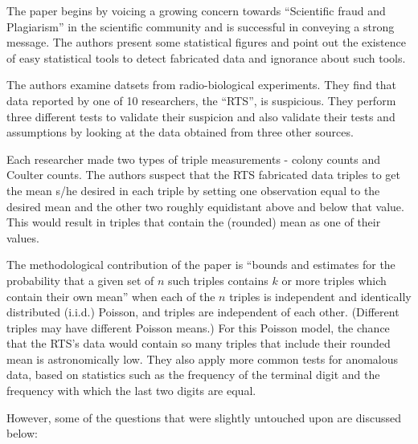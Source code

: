 \documentclass{article}
\begin{document}
The paper begins by voicing a growing concern towards ``Scientific fraud
and Plagiarism'' in the scientific community and is successful in
conveying a strong message.
The authors present some statistical figures and point out the existence of easy statistical tools to detect fabricated data and ignorance about such tools.

The authors examine datsets from radio-biological experiments. They find that data reported by one of 10 researchers, the ``RTS'', is suspicious.
They perform three different tests to validate their suspicion and also validate their tests and assumptions by looking at the data obtained from three other sources.

Each researcher made two types of triple measurements - colony counts and Coulter counts.
The authors suspect that the RTS fabricated data triples to get the mean s/he desired in each triple by setting one observation equal to the desired mean and the other two roughly equidistant above and below that value.
This would result in triples that contain the (rounded) mean as one of their values.

The methodological contribution of the paper is “bounds and estimates for the probability that a given set of $n$ such triples contains $k$ or more triples which contain their own mean” when each of the $n$ triples is independent and identically distributed (i.i.d.) Poisson, and triples are independent of each other.
(Different triples may have different Poisson means.)
For this Poisson model, the chance that the RTS's data would contain so many triples that include their rounded mean is astronomically low.
They also apply more common tests for anomalous data, based on statistics such as the frequency of the terminal digit and the frequency with which the last two digits are equal.

However, some of the questions that were slightly untouched upon are discussed below:
\end{document}
